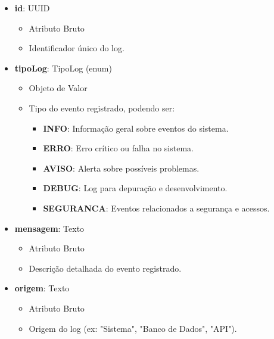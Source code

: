     \begin{itemize}
        \item \textbf{id}: UUID  
              \begin{itemize}
                  \item Atributo Bruto
                  \item Identificador único do log.
              \end{itemize}
    
        \item \textbf{tipoLog}: TipoLog (enum)  
              \begin{itemize}
                  \item Objeto de Valor
                  \item Tipo do evento registrado, podendo ser:
                  \begin{itemize}
                      \item \textbf{INFO}: Informação geral sobre eventos do sistema.
                      \item \textbf{ERRO}: Erro crítico ou falha no sistema.
                      \item \textbf{AVISO}: Alerta sobre possíveis problemas.
                      \item \textbf{DEBUG}: Log para depuração e desenvolvimento.
                      \item \textbf{SEGURANCA}: Eventos relacionados a segurança e acessos.
                  \end{itemize}
              \end{itemize}
    
        \item \textbf{mensagem}: Texto  
              \begin{itemize}
                  \item Atributo Bruto
                  \item Descrição detalhada do evento registrado.
              \end{itemize}
    
        \item \textbf{origem}: Texto  
              \begin{itemize}
                  \item Atributo Bruto
                  \item Origem do log (ex: "Sistema", "Banco de Dados", "API").
              \end{itemize}
    

\end{itemize}
